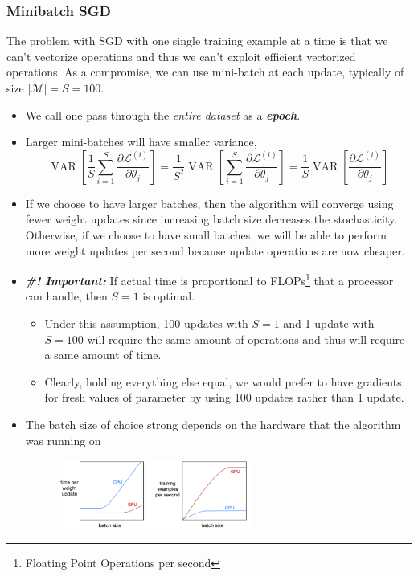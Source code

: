 \documentclass[11pt]{article}
\begin{document}
\subsubsection{Minibatch SGD}
The problem with SGD with one single training example at a time is that we can't vectorize operations and thus we can't exploit efficient vectorized operations. As a compromise, we can use mini-batch at each update, typically of size $|\mathcal{M}| = S = 100$. 
\begin{itemize}
    \item We call one pass through the \textit{entire dataset} as a \textbf{\textit{epoch}}. 
    \item Larger mini-batches will have smaller variance, 
        \begin{equation}
            \operatorname{VAR}\left[\frac{1}{S} \sum_{i=1}^{S} \frac{\partial \mathcal{L}^{(i)}}{\partial \theta_{j}}\right]=\frac{1}{S^{2}} \operatorname{VAR}\left[\sum_{i=1}^{S} \frac{\partial \mathcal{L}^{(i)}}{\partial \theta_{j}}\right]=\frac{1}{S} \operatorname{VAR}\left[\frac{\partial \mathcal{L}^{(i)}}{\partial \theta_{j}}\right]
        \end{equation}
    \item If we choose to have larger batches,  then the algorithm will converge using fewer weight updates since increasing batch size decreases the stochasticity. Otherwise, if we choose to have small batches, we will be able to perform more weight updates per second because update operations are now cheaper. 
    \item \textit{\textbf{\#! Important:}} If actual time is proportional to FLOPs\footnote{Floating Point Operations per second} that a processor can handle, then $S =1$ is optimal.
    \begin{itemize}
        \item Under this assumption, 100 updates with $S = 1$ and 1 update with $S = 100$ will require the same amount of operations and thus will require a same amount of time. 
        \item Clearly, holding everything else equal, we would prefer to have gradients for fresh values of parameter by using 100 updates rather than 1 update. 
    \end{itemize}
    \item The batch size of choice strong depends on the hardware that the algorithm was running on\cite{week4}
    \begin{figure}[H]
        \center\includegraphics[width=0.6\textwidth]{img/parallel_flops}
    \end{figure}
\end{itemize}
\end{document}
